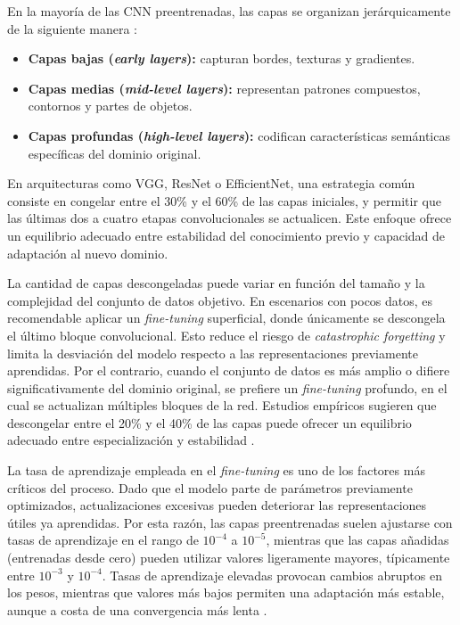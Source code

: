 	En la mayoría de las CNN preentrenadas, las capas se organizan jerárquicamente de la siguiente manera \cite{yosinski2014}:
	\begin{itemize}
		\item \textbf{Capas bajas (\textit{early layers}):} capturan bordes, texturas y gradientes.
		\item \textbf{Capas medias (\textit{mid-level layers}):} representan patrones compuestos, contornos y partes de objetos.
		\item \textbf{Capas profundas (\textit{high-level layers}):} codifican características semánticas específicas del dominio original.
	\end{itemize}
	
	En arquitecturas como VGG, ResNet o EfficientNet, una estrategia común consiste en congelar entre el 30\% y el 60\% de las capas iniciales, y permitir que las últimas dos a cuatro etapas convolucionales se actualicen. Este enfoque ofrece un equilibrio adecuado entre estabilidad del conocimiento previo y capacidad de adaptación al nuevo dominio.
	
	La cantidad de capas descongeladas puede variar en función del tamaño y la complejidad del conjunto de datos objetivo. En escenarios con pocos datos, es recomendable aplicar un \textit{fine-tuning} superficial, donde únicamente se descongela el último bloque convolucional. Esto reduce el riesgo de \textit{catastrophic forgetting} y limita la desviación del modelo respecto a las representaciones previamente aprendidas. Por el contrario, cuando el conjunto de datos es más amplio o difiere significativamente del dominio original, se prefiere un \textit{fine-tuning} profundo, en el cual se actualizan múltiples bloques de la red. Estudios empíricos sugieren que descongelar entre el 20\% y el 40\% de las capas puede ofrecer un equilibrio adecuado entre especialización y estabilidad \cite{yosinski2014}.
	
	La tasa de aprendizaje empleada en el \textit{fine-tuning} es uno de los factores más críticos del proceso. Dado que el modelo parte de parámetros previamente optimizados, actualizaciones excesivas pueden deteriorar las representaciones útiles ya aprendidas. Por esta razón, las capas preentrenadas suelen ajustarse con tasas de aprendizaje en el rango de $10^{-4}$ a $10^{-5}$, mientras que las capas añadidas (entrenadas desde cero) pueden utilizar valores ligeramente mayores, típicamente entre $10^{-3}$ y $10^{-4}$. Tasas de aprendizaje elevadas provocan cambios abruptos en los pesos, mientras que valores más bajos permiten una adaptación más estable, aunque a costa de una convergencia más lenta \cite{howard2018}.
	
